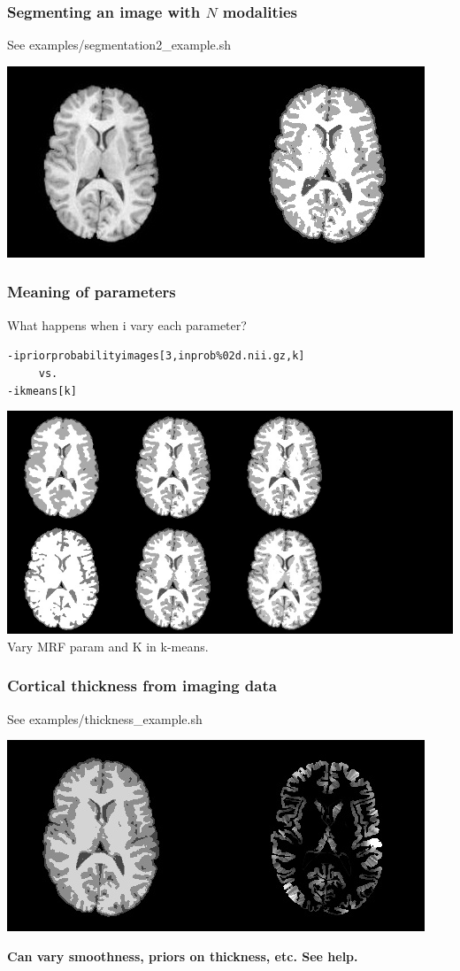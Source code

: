 \documentclass[18pt]{beamer}
\begin{document}
\begin{frame}
\frametitle{Segmenting an image with $N$ modalities}
See  examples/segmentation2\_example.sh

\begin{center}
\includegraphics[width=3.in]{../figures/r64sliceseg2.jpg}
\end{center}
 \end{frame}

\begin{frame}
\frametitle{Meaning of parameters}
What happens when i vary each parameter?
\begin{alltt}
-i priorprobabilityimages[3, inprob\%02d.nii.gz, k ]  \newline
~~~~~vs.  \newline
-i kmeans[ k ]
\end{alltt}
\begin{center}
\includegraphics[width=3.in]{../figures/r64segparams.jpg}\newline
Vary MRF param and K in k-means.
\end{center}
\end{frame}

\begin{frame}
\frametitle{Cortical thickness from imaging data}
See  examples/thickness\_example.sh

\begin{center}
\includegraphics[width=4.in]{../figures/r64thickness.jpg}
\end{center}
{\bf Can vary smoothness, priors on thickness, etc.  See help. }
\end{frame}
\end{document}

